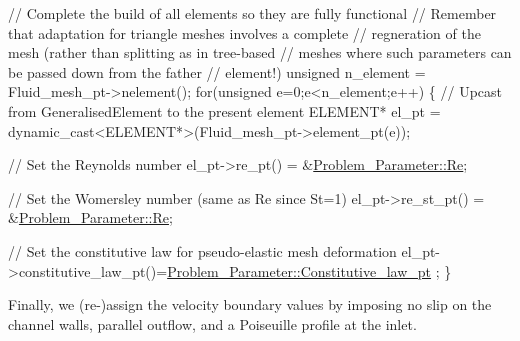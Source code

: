 \begin{DoxyCodeInclude}
 \textcolor{comment}{// Complete the build of all elements so they are fully functional}
 \textcolor{comment}{// Remember that adaptation for triangle meshes involves a complete}
 \textcolor{comment}{// regneration of the mesh (rather than splitting as in tree-based}
 \textcolor{comment}{// meshes where such parameters can be passed down from the father}
 \textcolor{comment}{// element!)}
 \textcolor{keywordtype}{unsigned} n\_element = Fluid\_mesh\_pt->nelement();
 \textcolor{keywordflow}{for}(\textcolor{keywordtype}{unsigned} e=0;e<n\_element;e++)
  \{
   \textcolor{comment}{// Upcast from GeneralisedElement to the present element}
   ELEMENT* el\_pt = \textcolor{keyword}{dynamic\_cast<}ELEMENT*\textcolor{keyword}{>}(Fluid\_mesh\_pt->element\_pt(e));
   
   \textcolor{comment}{// Set the Reynolds number}
   el\_pt->re\_pt() = &\hyperlink{namespaceProblem__Parameter_acc656299287d4d9a8374c2c501750b4f}{Problem\_Parameter::Re};
   
   \textcolor{comment}{// Set the Womersley number (same as Re since St=1)}
   el\_pt->re\_st\_pt() = &\hyperlink{namespaceProblem__Parameter_acc656299287d4d9a8374c2c501750b4f}{Problem\_Parameter::Re};
   
   \textcolor{comment}{// Set the constitutive law for pseudo-elastic mesh deformation}
   el\_pt->constitutive\_law\_pt()=\hyperlink{namespaceProblem__Parameter_a810f05c8d3e3331aed75643557d1057c}{Problem\_Parameter::Constitutive\_law\_pt}
      ;
  \}

\end{DoxyCodeInclude}


Finally, we (re-\/)assign the velocity boundary values by imposing no slip on the channel walls, parallel outflow, and a Poiseuille profile at the inlet.


